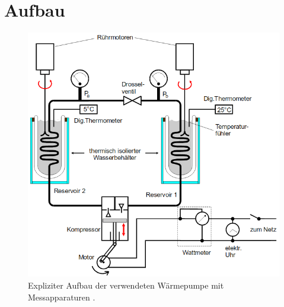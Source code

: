 \section{Aufbau}
\begin{figure}
	\centering
	\includegraphics[width=\linewidth-100pt,height=\textheight-100pt,keepaspectratio]{content/Bilder/Aufbau2.png}
	\caption{Expliziter Aufbau der verwendeten Wärmepumpe mit Messapparaturen \cite{V206}.}
	\label{fig:Aufbau2}
\end{figure}